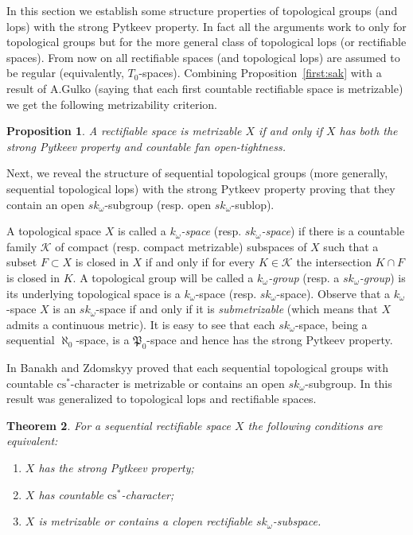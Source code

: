 \documentclass{amsart}
\newtheorem{theorem}{Theorem}[section]
\newtheorem{proposition}[theorem]{Proposition}
\theoremstyle{definition}
\begin{document}
In this section we establish some structure properties of topological groups (and lops) with the strong Pytkeev property. In fact all the arguments work to only for topological groups but for the more general class of topological lops (or rectifiable spaces). From now on all rectifiable spaces (and topological lops) are assumed to be regular (equivalently, $T_0$-spaces).
 Combining Proposition~\ref{first:sak} with a result of A.Gulko (saying that each first countable rectifiable space is metrizable) we get the following metrizability criterion.

\begin{proposition} A rectifiable space is metrizable $X$ if and only if $X$ has both the strong Pytkeev property and countable fan open-tightness.
\end{proposition}

Next, we reveal the structure of sequential topological groups (more generally, sequential topological lops) with the strong Pytkeev property proving that they contain an open $sk_{\omega}$-subgroup (resp. open $sk_{\omega}$-sublop).

A topological space $X$ is called a {\em $k_{\omega}$-space} (resp. {\em $sk_{\omega}$-space}) if there is a countable family ${\mathcal K}$ of compact (resp. compact metrizable) subspaces of $X$ such that a subset $F\subset X$ is closed in $X$ if and only if for every $K\in{\mathcal K}$ the intersection $K\cap F$ is closed in $K$. A topological group will be called a {\em $k_{\omega}$-group} (resp. a {\em $sk_{\omega}$-group}) is its underlying topological space is a $k_{\omega}$-space (resp. $sk_{\omega}$-space).
Observe that a $k_{\omega}$-space $X$ is an $sk_{\omega}$-space if and only if it is {\em submetrizable} (which means that $X$ admits a continuous metric). It is easy to see that each $sk_{\omega}$-space, being a sequential $\aleph_0$-space, is a ${\mathfrak P}_0$-space and hence has the strong Pytkeev property.

In \cite{BZd} Banakh and Zdomskyy proved that each sequential topological groups with countable ${\mathrm{cs}}^*$-character is metrizable or contains an open $sk_{\omega}$-subgroup. In \cite{BR} this result was generalized to topological lops and rectifiable spaces.

\begin{theorem}\label{t:normrec} For a sequential rectifiable space $X$ the following conditions are equivalent:
\begin{enumerate}
\item $X$ has the strong Pytkeev property;
\item $X$ has countable ${\mathrm{cs}}^*$-character;
\item $X$ is metrizable or contains a clopen rectifiable $sk_{\omega}$-subspace.
\end{enumerate}
\end{theorem}
\end{document}
